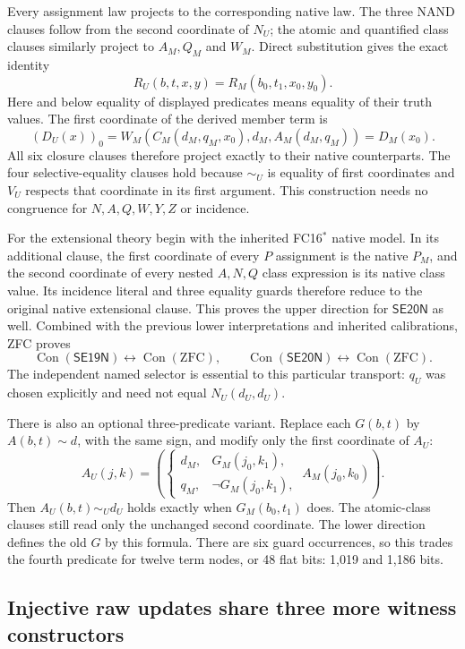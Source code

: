 Every assignment law projects to the corresponding native law.
The three NAND clauses follow from the second coordinate of $N_U$;
the atomic and quantified class clauses similarly project to $A_M,Q_M$
and $W_M$. Direct substitution gives the exact identity
\[
 R_U(b,t,x,y)=R_M(b_0,t_1,x_0,y_0).
\]
Here and below equality of displayed predicates means equality of
their truth values. The first coordinate of the derived member term is
\[
 (D_U(x))_0=
 W_M(C_M(d_M,q_M,x_0),d_M,A_M(d_M,q_M))=D_M(x_0).
\]
All six closure clauses therefore project exactly to their native
counterparts. The four selective-equality clauses hold because
$\sim_U$ is equality of first coordinates and $V_U$ respects that
coordinate in its first argument. This construction needs no
congruence for $N,A,Q,W,Y,Z$ or incidence.

For the extensional theory begin with the inherited FC16$^*$ native
model. In its additional clause, the first coordinate of every $P$
assignment is the native $P_M$, and the second coordinate of every
nested $A,N,Q$ class expression is its native class value. Its
incidence literal and three equality guards therefore reduce to the
original native extensional clause. This proves the upper direction
for $\mathsf{SE20N}$ as well. Combined with the previous lower
interpretations and inherited calibrations, ZFC proves
\[
 \operatorname{Con}(\mathsf{SE19N})\leftrightarrow
 \operatorname{Con}(\mathrm{ZFC}),\qquad
 \operatorname{Con}(\mathsf{SE20N})\leftrightarrow
 \operatorname{Con}(\mathrm{ZFC}).
\]
The independent named selector is essential to this particular
transport: $q_U$ was chosen explicitly and need not equal
$N_U(d_U,d_U)$.

There is also an optional three-predicate variant. Replace each
$G(b,t)$ by $A(b,t)\sim d$, with the same sign, and modify only the
first coordinate of $A_U$:
\[
 A_U(j,k)=
 \left(
 \begin{cases}d_M,&G_M(j_0,k_1),\\q_M,&\neg G_M(j_0,k_1),\end{cases}
 \ A_M(j_0,k_0)\right).
\]
Then $A_U(b,t)\sim_U d_U$ holds exactly when $G_M(b_0,t_1)$ does.
The atomic-class clauses still read only the unchanged second
coordinate. The lower direction defines the old $G$ by this formula.
There are six guard occurrences, so this trades the fourth predicate
for twelve term nodes, or 48 flat bits: 1,019 and 1,186 bits.

\subsection{Injective raw updates share three more witness constructors}
\label{se:witness-fusion}

